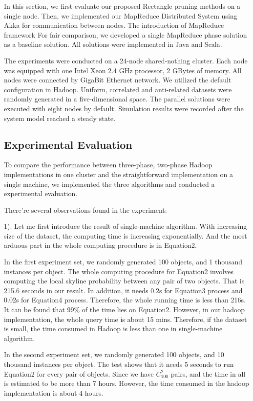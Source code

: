 In this section, we first evaluate our proposed Rectangle pruning methods on a single node. Then, we implemented our MapReduce Distributed System using Akka for communication between nodes. The introduction of MapReduce framework
For fair comparison, we developed a single MapReduce phase solution as a baseline solution. All solutions were implemented in Java and Scala.

The experiments were conducted on a 24-node shared-nothing
cluster. Each node was equipped with one Intel Xeon 2.4 GHz
processor, 2 GBytes of memory. All nodes were connected by GigaBit
Ethernet network. We utilized the default configuration in Hadoop.
Uniform, correlated and anti-related datasets were randomly generated in a
five-dimensional space. The parallel solutions were executed with
eight nodes by default. Simulation results were recorded after the
system model reached a steady state.


\subsection{Experimental Evaluation}
To compare the performance between three-phase, two-phase Hadoop implementations in one cluster and the straightforward implementation on a single machine, we implemented the three algorithms and conducted a experimental evaluation.

There're several observations found in the experiment:


1). Let me first introduce the result of single-machine algorithm. With increasing size of the dataset, the computing time is increasing exponentially. And the most arduous part in the whole computing procedure is in Equation2.

In the first experiment set, we randomly generated 100 objects, and 1 thousand instances per object. The whole computing procedure for Equation2 involves computing the local skyline probability between any pair of two objects. That is 215.6 seconds in our result. In addition, it needs 0.2s for Equation3 process and 0.02s for Equation4 process. Therefore, the whole running time is less than 216s. It can be found that 99\% of the time lies on Equation2. However, in our hadoop implementation, the whole query time is about 15 mins. Therefore, if the dataset is small, the time consumed in Hadoop is less than one in single-machine algorithm.

In the second experiment set, we randomly generated 100 objects, and 10 thousand instances per object. The test shows that it needs 5 seconds to run Equation2 for every pair of objects. Since we have \(C_{100}^{2}\) pairs, and the time in all is estimated to be more than 7 hours. However, the time consumed in the hadoop implementation is about 4 hours.

